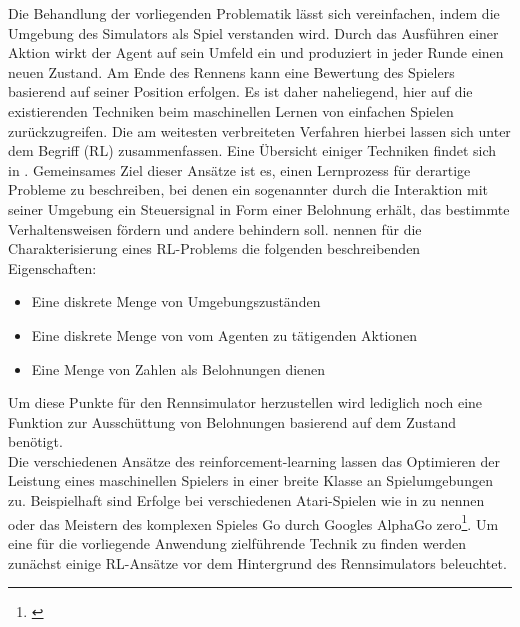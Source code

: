 Die Behandlung der vorliegenden Problematik lässt sich vereinfachen, indem die Umgebung des Simulators als Spiel verstanden wird. Durch das Ausführen einer Aktion wirkt der Agent auf sein Umfeld ein und produziert in jeder Runde einen neuen Zustand. Am Ende des Rennens kann eine Bewertung des Spielers basierend auf seiner Position erfolgen. Es ist daher naheliegend, hier auf die existierenden Techniken beim maschinellen Lernen von einfachen Spielen zurückzugreifen. Die am weitesten verbreiteten Verfahren hierbei lassen sich unter dem Begriff  (RL) zusammenfassen. Eine Übersicht einiger Techniken findet sich in \cite{reinforcement_learning_study}. Gemeinsames Ziel dieser Ansätze ist es, einen Lernprozess für derartige Probleme zu beschreiben, bei denen ein sogenannter  durch die Interaktion mit seiner Umgebung ein Steuersignal in Form einer Belohnung erhält, das bestimmte Verhaltensweisen fördern und andere behindern soll. \cite{reinforcement_learning_study} nennen für die Charakterisierung eines RL-Problems die folgenden beschreibenden Eigenschaften: 
 \begin{itemize}
     \item Eine diskrete Menge von Umgebungszuständen
     \item Eine diskrete Menge von vom Agenten zu tätigenden Aktionen
     \item Eine Menge von Zahlen als Belohnungen dienen
 \end{itemize}
 Um diese Punkte für den Rennsimulator herzustellen wird lediglich noch eine Funktion zur Ausschüttung von Belohnungen basierend auf dem Zustand benötigt.\\
 Die verschiedenen Ansätze des reinforcement-learning lassen das Optimieren der Leistung eines maschinellen Spielers in einer breite Klasse an Spielumgebungen zu. Beispielhaft sind Erfolge bei verschiedenen Atari-Spielen wie in \cite{atari_deep_reinforcement_learning} zu nennen oder das Meistern des komplexen Spieles Go durch Googles AlphaGo zero\footnote{\cite{alpha_go}}. Um eine für die vorliegende Anwendung zielführende Technik zu finden werden zunächst einige RL-Ansätze vor dem Hintergrund des Rennsimulators beleuchtet.


